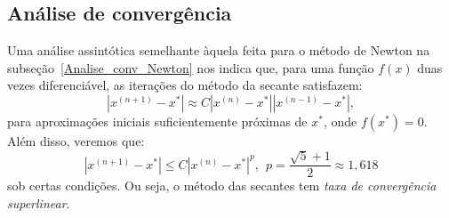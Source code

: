 \begin{ex}
\subsection{Análise de convergência}

Uma análise assintótica semelhante àquela feita para o método de Newton na subseção~\ref{Analise_conv_Newton} nos indica que, para uma função $f(x)$ duas vezes diferenciável, as iterações do método da secante satisfazem:
\begin{equation}
  |x^{(n+1)} - x^*| \approx C |x^{(n)} - x^*||x^{(n-1)} - x^*|,
\end{equation}
para aproximações iniciais suficientemente próximas de $x^*$, onde $f(x^*) = 0$. Além disso, veremos que:
\begin{equation}
  |x^{(n+1)} - x^*| \leq C |x^{(n)} - x^*|^{p},~~ p=\frac{\sqrt{5}+1}{2}\approx 1,618
\end{equation}
sob certas condições. Ou seja, o método das secantes tem \emph{taxa de convergência superlinear}.


\end{ex}
